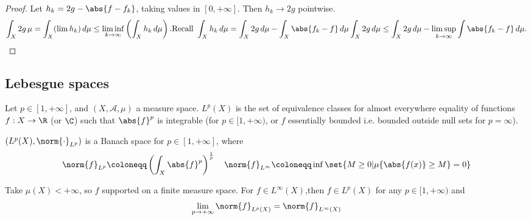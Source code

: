 \documentclass{article}
\begin{document}
\begin{proof}
    Let $h_k = 2g - \abs{f - f_k}$, taking values in $[0, +\infty]$.
    Then $h_k \to 2g$ pointwise.
    \begin{gather*}
        \int_X 2g \, \mu = \int_X (\lim h_k) \, d\mu \leq \liminf_{k \to \infty} \left(\int_X h_k \, d\mu\right).
        \text{Recall }\int_X h_k \, d\mu = \int_X 2g \, d\mu - \int_X \abs{f_k-f} \, d\mu
        \int_X 2g \, d\mu \leq \int_X 2g \, d\mu - \limsup_{k \to \infty} \int \abs{f_k - f} \, d\mu.
    \end{gather*}
\end{proof}

\subsection{Lebesgue spaces}
\begin{defi}
    Let $p \in [1, +\infty]$, and $(X, \mathscr{A}, \mu)$ a measure space.
    $L^p(X)$ is the set of equivalence classes for almost everywhere equality of functions $f: X \to  \R$ (or $\C$) such that $\abs{f}^p$ is integrable (for $p \in [1, +\infty)$, or $f$ essentially bounded i.e. bounded outside null sets for $p=\infty$).
\end{defi}

\begin{thm}
    $(L^p(X), \norm{\cdot}_{L^p})$ is a Banach space for $p \in [1, +\infty]$, where
    \begin{equation*}
        \norm{f}_{L^p} \coloneqq \left(\int_X \abs{f}^p\right)^{\frac{1}{p}} \quad \norm{f}_{L^\infty} \coloneqq \inf\set{M \geq 0 | \mu\{\abs{f(x)} \geq M\} = 0}
    \end{equation*}
\end{thm}
\begin{ex}
    Take $\mu(X) < +\infty$, so $f$ supported on a finite measure space. For $f \in L^\infty(X)$,then $f \in L^p(X)$ for any $p \in [1, +\infty)$ and
    \begin{equation*}
        \lim_{p \to +\infty} \norm{f}_{L^p(X)} = \norm{f}_{L^\infty(X)}
    \end{equation*}
\end{ex}
\end{document}
